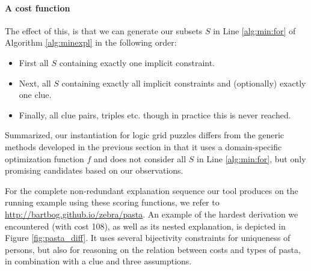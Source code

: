 \paragraph{A cost function}
The effect of this, is that we can generate our subsets $S$ in Line \ref{alg:min:for}
 of Algorithm \ref{alg:minexpl} in the following order:
\begin{itemize}
 \item First all $S$ containing exactly one implicit constraint.
 \item Next, all $S$ containing exactly all implicit constraints and (optionally) exactly one clue.
 \item Finally, all clue pairs, triples etc. though in practice this is never reached.
\end{itemize}
Summarized, our instantiation for logic grid puzzles differs from the generic methods developed in the previous section in that it uses a domain-specific optimization function $f$ and does not consider all $S$ in Line \ref{alg:min:for}, but only promising candidates based on our observations.

For the complete non-redundant explanation sequence our tool produces on the running example using these scoring functions, we refer to \url{http://bartbog.github.io/zebra/pasta}. An example of the hardest derivation we encountered (with cost 108), as well as its nested explanation, is depicted in Figure \ref{fig:pasta_diff}. It uses several bijectivity constraints for uniqueness of persons, but also for reasoning on the relation between costs and types of pasta, in combination with a clue and three assumptions.

